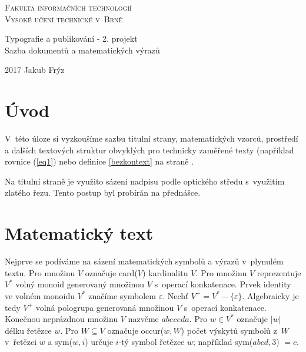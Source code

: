 \documentclass[a4paper, twocolumn, 11pt]{article}
\theoremstyle{definition}
\theoremstyle{plain}
\theoremstyle{plain}
\begin{document}
\begin{titlepage}

\begin{center}

{\Huge \textsc{Fakulta informačních technologií\\Vysoké učení technické v~Brně}}

{\LARGE Typografie a publikování - 2. projekt\\Sazba dokumentů a matematických výrazů}

\enlargethispage{0.5cm}

{\Large 2017 \hfill Jakub Frýz}

\end{center}

\end{titlepage}

\section*{Úvod}

V~této úloze si vyzkoušíme sazbu titulní strany, matematických vzorců, prostředí a dalších textových struktur obvyklých pro technicky zaměřené texty (například rovnice (\ref{eq1}) nebo definice \ref{bezkontext} na straně \pageref{bezkontext}.

Na titulní straně je využito sázení nadpisu podle optického středu s~využitím zlatého řezu. Tento postup byl probírán na přednášce.

\section{Matematický text}

Nejprve se podíváme na sázení matematických symbolů a výrazů v~plynulém textu. Pro množinu $V$ označuje card($V$) kardinalitu $V$.
Pro množinu $V$ reprezentuje $V^*$ volný monoid generovaný množinou $V$ s~operací konkatenace.
Prvek identity ve volném monoidu $V^*$ značíme symbolem $\varepsilon$.
Nechť $V^+ = V^* - \{\varepsilon\}$. Algebraicky je tedy $V^+$ volná pologrupa generovaná množinou $V$ s~operací konkatenace.
Konečnou neprázdnou množinu $V$ nazvěme $abeceda$.
Pro $w \in V^*$ označuje $|w|$ délku řetězce $w$. Pro $W \subseteq V$ označuje occur($w, W$) počet výskytů symbolů z~$W$ v~řetězci $w$ a sym($w, i$) určuje $i$-tý symbol řetězce $w$; například sym($abcd, 3$) $= c$.
\end{document}
